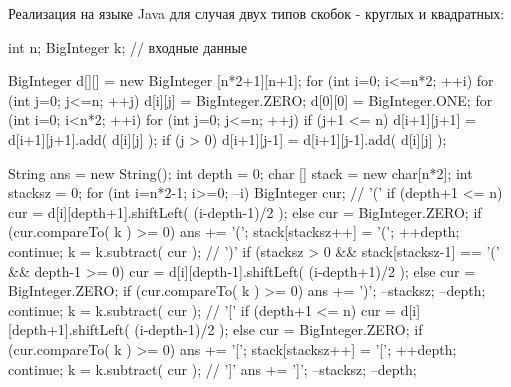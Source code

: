 Реализация на языке Java для случая двух типов скобок - круглых и квадратных:

\code
int n;  BigInteger k;  // входные данные

BigInteger d[][] = new BigInteger [n*2+1][n+1];
for (int i=0; i<=n*2; ++i)
	for (int j=0; j<=n; ++j)
		d[i][j] = BigInteger.ZERO;
d[0][0] = BigInteger.ONE;
for (int i=0; i<n*2; ++i)
	for (int j=0; j<=n; ++j) {
		if (j+1 <= n)
			d[i+1][j+1] = d[i+1][j+1].add( d[i][j] );
		if (j > 0)
			d[i+1][j-1] = d[i+1][j-1].add( d[i][j] );
	}

String ans = new String();
int depth = 0;
char [] stack = new char[n*2];
int stacksz = 0;
for (int i=n*2-1; i>=0; --i) {
	BigInteger cur;
	// '('
	if (depth+1 <= n)
		cur = d[i][depth+1].shiftLeft( (i-depth-1)/2 );
	else
		cur = BigInteger.ZERO;
	if (cur.compareTo( k ) >= 0) {
		ans += '(';
		stack[stacksz++] = '(';
		++depth;
		continue;
	}
	k = k.subtract( cur );
	// ')'
	if (stacksz > 0 && stack[stacksz-1] == '(' && depth-1 >= 0)
		cur = d[i][depth-1].shiftLeft( (i-depth+1)/2 );
	else
		cur = BigInteger.ZERO;
	if (cur.compareTo( k ) >= 0) {
		ans += ')';
		--stacksz;
		--depth;
		continue;
	}
	k = k.subtract( cur );
	// '['
	if (depth+1 <= n)
		cur = d[i][depth+1].shiftLeft( (i-depth-1)/2 );
	else
		cur = BigInteger.ZERO;
	if (cur.compareTo( k ) >= 0) {
		ans += '[';
		stack[stacksz++] = '[';
		++depth;
		continue;
	}
	k = k.subtract( cur );
	// ']'
	ans += ']';
	--stacksz;
	--depth;
}
\endcode
